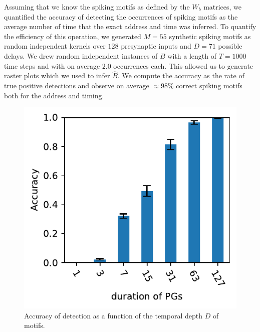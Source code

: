 \documentclass[11pt]{article}
\begin{document}
Assuming that we know the spiking motifs as defined by the $W_b$ matrices, we quantified the accuracy of detecting the occurrences of spiking motifs as the average number of time that the exact address and time was inferred.  
To quantify the efficiency of this operation, we generated $M=55$ synthetic spiking motifs as random independent kernels over $128$ presynaptic inputs and $D=71$ possible delays. We drew random independent instances of $B$ with a length of $T=1000$ time steps and with on average $2.0$ occurrences each. This allowed us to generate raster plots which we used to infer $\hat{B}$. We compute the accuracy as the rate of true positive detections and observe on average $\approx 98\%$ correct spiking motifs both for the address and timing.

\begin{figure}
\vspace{-10pt}
\includegraphics[width=\linewidth]{figure_N_PG_time.pdf}
\vspace{-25pt}
{
\caption{Accuracy of detection as a function of the temporal depth $D$ of motifs.
}
\label{fig:3}
}
\end{figure}
\end{document}

